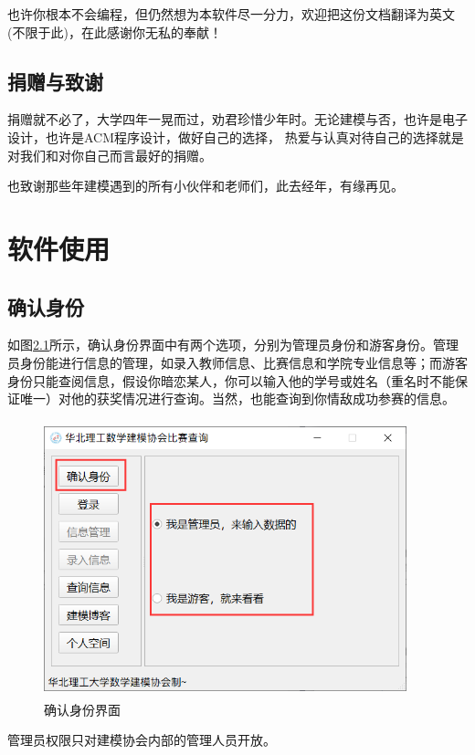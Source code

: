\documentclass[cn, 11pt, chinese, show]{elegantbook}
\begin{document}
也许你根本不会编程，但仍然想为本软件尽一分力，欢迎把这份文档翻译为英文(不限于此)，在此感谢你无私的奉献！

\section{捐赠与致谢}

捐赠就不必了，大学四年一晃而过，劝君珍惜少年时。无论建模与否，也许是电子设计，也许是ACM程序设计，做好自己的选择，
热爱与认真对待自己的选择就是对我们和对你自己而言最好的捐赠。

也致谢那些年建模遇到的所有小伙伴和老师们，此去经年，有缘再见。

\chapter{软件使用}

\section{确认身份}

如图\ref{fig:verify}所示，确认身份界面中有两个选项，分别为管理员身份和游客身份。管理员身份能进行信息的管理，如录入教师信息、比赛信息和学院专业信息等；而游客身份只能查阅信息，假设你暗恋某人，你可以输入他的学号或姓名（重名时不能保证唯一）对他的获奖情况进行查询。当然，也能查询到你情敌成功参赛的信息。
\begin{figure}[h]
    \centering
    \includegraphics[width=10.5cm, height=8cm]{figure/2.png}
    \caption{确认身份界面}
    \label{fig:verify}
\end{figure}

\begin{remark}
管理员权限只对建模协会内部的管理人员开放。
\end{remark}
\end{document}
